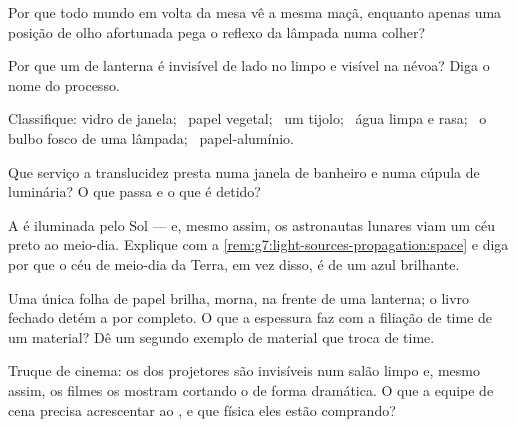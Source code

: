 \begin{exercise}[$\star$]\label{exo:g7:light-sources-propagation:4}
Por que todo mundo em volta da mesa vê a mesma maçã, enquanto apenas
uma posição de olho afortunada pega o reflexo da lâmpada numa colher?
\end{exercise}

\begin{exercise}[$\star$]\label{exo:g7:light-sources-propagation:5}
Por que um  de lanterna é invisível de lado no  limpo e
visível na névoa? Diga o nome do processo.
\end{exercise}

\begin{exercise}[$\star$]\label{exo:g7:light-sources-propagation:6}
Classifique: vidro de janela; \ papel vegetal; \ um tijolo; \ água
limpa e rasa; \ o bulbo fosco de uma lâmpada; \ papel-alumínio.
\end{exercise}

\begin{exercise}[$\star$]\label{exo:g7:light-sources-propagation:7}
Que serviço a translucidez presta numa janela de banheiro e numa
cúpula de luminária? O que passa e o que é detido?
\end{exercise}

\begin{exercise}[$\star$]\label{exo:g7:light-sources-propagation:8}
A  é iluminada pelo Sol --- e, mesmo assim, os astronautas lunares
viam um céu preto ao meio-dia. Explique com a
\cref{rem:g7:light-sources-propagation:space} e diga por que o céu de
meio-dia da Terra, em vez disso, é de um azul brilhante.
\end{exercise}

\begin{exercise}[$\star\star$]\label{exo:g7:light-sources-propagation:9}
Uma única folha de papel brilha, morna, na frente de uma lanterna; o
livro fechado detém a  por completo. O que a espessura faz com a
filiação de time de um material? Dê um segundo exemplo de material
que troca de time.
\end{exercise}

\begin{exercise}[$\star\star$]\label{exo:g7:light-sources-propagation:10}
Truque de cinema: os  dos projetores são invisíveis num salão
limpo e, mesmo assim, os filmes os mostram cortando o  de forma
dramática. O que a equipe de cena precisa acrescentar ao , e que
física eles estão comprando?
\end{exercise}

